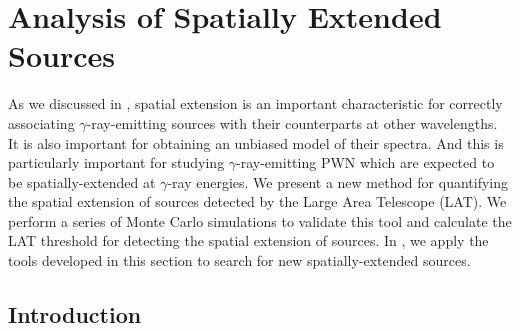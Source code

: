 
\chapter{Analysis of Spatially Extended  Sources}


As we discussed in , spatial extension is an important
characteristic for correctly associating $\gamma$-ray-emitting
sources with their counterparts at other wavelengths.  It is also
important for obtaining an unbiased model of their spectra.  And this
is particularly important for studying $\gamma$-ray-emitting \ac{PWN}
which are expected to be spatially-extended at $\gamma$-ray energies.
We present a new method for quantifying the spatial extension of
sources detected by the Large Area Telescope (LAT).  We perform a
series of Monte Carlo simulations to validate this tool and calculate
the LAT threshold for detecting the spatial extension of sources. In
, we apply the tools developed in this section
to search for new spatially-extended sources.

\section{Introduction}

